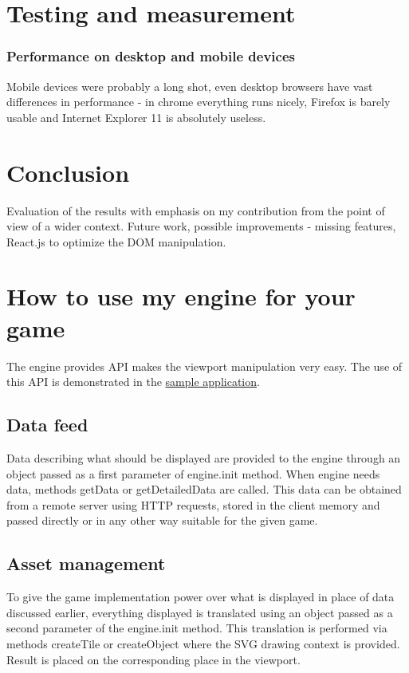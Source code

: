 \documentclass[11pt,oneside, final]{fithesis2}
\begin{document}
\chapter{Testing and measurement}
\label{testing}
\subsection{Performance on desktop and mobile devices}
Mobile devices were probably a long shot, even desktop browsers have vast differences in performance - in chrome everything runs nicely, Firefox is barely usable and Internet Explorer 11 is absolutely useless.

\chapter{Conclusion}
Evaluation of the results with emphasis on my contribution from the point of view of a wider context.
Future work, possible improvements - missing features, React.js to optimize the DOM manipulation.


\appendix
\chapter{How to use my engine for your game}
The engine provides API makes the viewport manipulation very easy. The use of this API is demonstrated in the \href{https://github.com/vit-svoboda/svg-engine/tree/master/src/main/webapp/Scripts/game}{sample application}.

\section{Data feed}
Data describing what should be displayed are provided to the engine through an object passed as a first parameter of engine.init method. When engine needs data, methods getData or getDetailedData are called. This data can be obtained from a remote server using HTTP requests, stored in the client memory and passed directly or in any other way suitable for the given game.

\section{Asset management}
To give the game implementation power over what is displayed in place of data discussed earlier, everything displayed is translated using an object passed as a second parameter of the engine.init method. This translation is performed via methods createTile or createObject where the SVG drawing context is provided. Result is placed on the corresponding place in the viewport.
\end{document}
